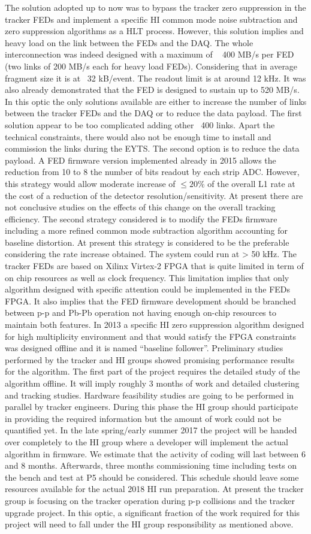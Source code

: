 The solution adopted up to now was to bypass the tracker zero suppression in the tracker FEDs and implement a specific HI common mode noise subtraction and zero suppression algorithms as a HLT process. However, this solution implies and heavy load on the link between the FEDs and the DAQ.  The whole interconnection was indeed designed with a maximum of ~ 400 MB/s per FED (two links of 200 MB/s each for heavy load FEDs).  Considering that in average fragment size it is at ~32 kB/event. The readout limit is at around 12 kHz. It was also already demonstrated that the FED is designed to sustain up to 520 MB/s. In this optic the only solutions available are either to increase the number of links between the tracker FEDs and the DAQ or to reduce the data payload. The first solution appear to be too complicated adding other ~400 links. Apart the technical constraints, there would also not be enough time to install and commission the links during the EYTS. The second option is to reduce the data payload. A FED firmware version implemented already in 2015 allows the reduction from 10 to 8 the number of bits readout by each strip ADC. However, this strategy would allow moderate increase of $\le 20 \%$ of the overall L1 rate at the cost of a reduction of the detector resolution/sensitivity. At present there are not conclusive studies on the effects of this change on the overall tracking efficiency. The second strategy considered is to modify the FEDs firmware including a more refined common mode subtraction algorithm accounting for baseline distortion.  At present this strategy is considered to be the preferable considering the rate increase obtained. The system could run at > 50 kHz. The tracker FEDs are based on Xilinx Virtex-2 FPGA that is quite limited in term of on chip resources as well as clock frequency. This limitation implies that only algorithm designed with specific attention could be implemented in the FEDs FPGA. It also implies that the FED firmware development should be branched between p-p and Pb-Pb operation not having enough on-chip resources to maintain both features. In 2013 a specific HI zero suppression algorithm designed for high multiplicity environment and that would satisfy the FPGA constraints was designed offline and it is named “baseline follower”.  Preliminary studies performed by the tracker and HI groups showed promising performance results for the algorithm. The first part of the project requires the detailed study of the algorithm offline. It will imply roughly 3 months of work and detailed clustering and tracking studies. Hardware feasibility studies are going to be performed in parallel by tracker engineers. During this phase the HI group should participate in providing the required information but the amount of work could not be quantified yet. In the late spring/early summer 2017 the project will be handed over completely to the HI group where a developer will implement the actual algorithm in firmware. We estimate that the activity of coding will last between 6 and 8 months. Afterwards, three months commissioning time including tests on the bench and test at P5 should be considered. This schedule should leave some resources available for the actual 2018 HI run preparation. At present the tracker group is focusing on the tracker operation during p-p collisions and the tracker upgrade project. In this optic, a significant fraction of the work required for this project will need to fall under the HI group responsibility as mentioned above. 
